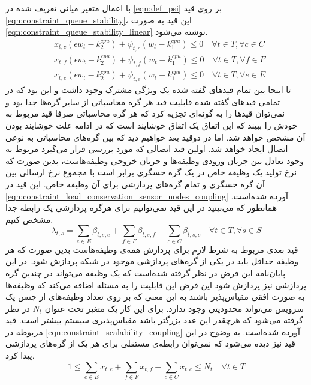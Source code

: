 	با اعمال متغیر میانی تعریف شده در \cref{eqn:def_psi} بر روی قید \cref{eqn:constraint_queue_stability}، این قید به صورت \cref{eqn:constraint_queue_stability_linear} نوشته می‌شود. 
	\begin{subequations}\label{eqn:constraint_queue_stability_linear}
		\begin{align}
			&x_{t,c}(\epsilon w_t - k_2^{cpu}) + \psi_{t,c}(w_t - k_1^{cpu}) \le 0 \quad \forall{t \in T}, \forall{c \in C} \\
			&x_{t,f}(\epsilon w_t - k_2^{cpu}) + \psi_{t,f}(w_t - k_1^{cpu}) \le 0 \quad \forall{t \in T}, \forall{f \in F} \\
			&x_{t,e}(\epsilon w_t - k_2^{cpu}) + \psi_{t,e}(w_t - k_1^{cpu}) \le 0 \quad \forall{t \in T}, \forall{e \in E}
		\end{align}
	\end{subequations}
	تا اینجا بین تمام قیدهای گفته شده یک ویژگی مشترک وجود داشت و این بود که در تمامی قیدهای گفته شده قابلیت قید هر گره محاسباتی از سایر گره‌ها جدا بود و نمی‌توان قیدها را به گونه‌ای تجزیه کرد که هر گره محاسباتی صرفا قید مربوط به خودش را ببیند که این اتفاق یک اتفاق خوشایند است که در ادامه علت خوشایند بودن آن مشخص خواهد شد. اما در دوقید بعد خواهیم دید که بین گره‌های محاسباتی به نوعی اتصال ایجاد خواهد شد. 
	اولین قید اتصالی که مورد بررسی قرار می‌گیرد مربوط به وجود تعادل بین جریان ورودی وظیفه‌ها و جریان خروجی وظیفه‌هاست، بدین صورت که نرخ تولید یک وظیفه خاص در یک گره‌ حسگری برابر است با مجموع نرخ ارسالی بین آن گره حسگری و تمام گره‌های پردازشی برای آن وظیفه خاص. این قید در \cref{eqn:constraint_load_conservation_sensor_nodes_coupling} آورده شده‌است. همانطور که می‌بینید در این قید نمی‌توانیم برای هرگره پردازشی یک رابطه جدا مشخص کنیم. 
	\begin{equation}\label{eqn:constraint_load_conservation_sensor_nodes_coupling}
	\lambda_{t,s} = \sum_{e \in E} \beta_{t,s,e} + \sum_{f 	\in F} \beta_{t,s,f}
	+\sum_{c \in C}\beta_{t,s,c} \quad \forall{t \in T}, \forall{s \in S}
	\end{equation} 
	قید بعدی مربوط به شرط لازم برای پردازش همه‌ی وظیفه‌هاست بدین صورت که هر وظیفه حداقل باید در یکی از گره‌های پردازشی موجود در شبکه پردازش شود. در این پایان‌نامه این فرض در نظر گرفته شده‌است که یک وظیفه می‌تواند در چندین گره پردازشی نیز پردازش شود این فرض این قابلیت را به مسئله اضافه می‌کند که وظیفه‌ها به صورت افقی مقیاس‌پذیر باشند به این معنی که بر روی تعداد وظیفه‌های از جنس یک سرویس می‌تواند محدودیتی وجود ندارد. برای این کار یک متغیر تحت عنوان $N_t$ در نظر گرفته می‌شود که هرچقدر این عدد بزرگتر باشد مقیاس‌پذیری سیستم بیشتر است. قید مربوطه در \cref{eqn:constraint_scalability_coupling} آورده شده‌است. به وضوح در این قید نیز دیده می‌شود که نمی‌توان رابطه‌ی مستقلی برای هر یک از گره‌های پردازشی پیدا کرد. 
	\begin{equation}\label{eqn:constraint_scalability_coupling}
		1 \le \sum_{e \in E}x_{t,e} + \sum_{f \in F}x_{t,f} + \sum_{c \in C}x_{t,c} \le N_t \quad \forall{t \in T}
	\end{equation}
